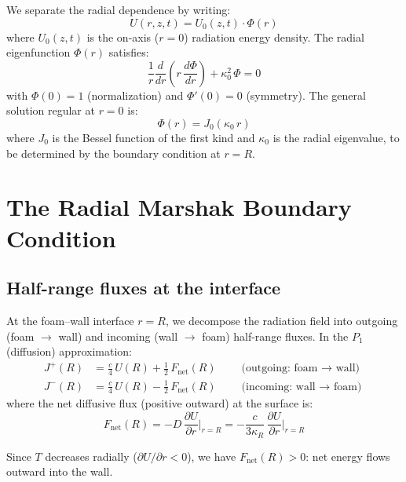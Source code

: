 \documentclass[12pt]{article}
\newcommand{\Rcm}{R}
\newcommand{\pder}[2]{\frac{\partial #1}{\partial #2}}
\begin{document}
We separate the radial dependence by writing:
\begin{equation}
    U(r, z, t) = U_0(z, t) \cdot \Phi(r)
    \label{eq:U_separation}
\end{equation}
where $U_0(z,t)$ is the on-axis ($r=0$) radiation energy density. The radial
eigenfunction $\Phi(r)$ satisfies:
\begin{equation}
    \frac{1}{r}\frac{d}{dr}\left(r\,\frac{d\Phi}{dr}\right) + \kappa_0^2\,\Phi = 0
    \label{eq:bessel_ode}
\end{equation}
with $\Phi(0) = 1$ (normalization) and $\Phi'(0) = 0$ (symmetry). The general
solution regular at $r = 0$ is:
\begin{equation}
    \boxed{\Phi(r) = J_0(\kappa_0\, r)}
    \label{eq:bessel_solution}
\end{equation}
where $J_0$ is the Bessel function of the first kind and $\kappa_0$ is the
radial eigenvalue, to be determined by the boundary condition at $r = \Rcm$.


\section{The Radial Marshak Boundary Condition}

\subsection{Half-range fluxes at the interface}

At the foam--wall interface $r = \Rcm$, we decompose the radiation field
into outgoing (foam $\to$ wall) and incoming (wall $\to$ foam) half-range
fluxes. In the $P_1$ (diffusion) approximation:
\begin{align}
    J^+(R) &= \frac{c}{4}\,U(R) + \frac{1}{2}\,F_{\mathrm{net}}(R)
    \qquad \text{(outgoing: foam $\to$ wall)}
    \label{eq:J_plus} \\[6pt]
    J^-(R) &= \frac{c}{4}\,U(R) - \frac{1}{2}\,F_{\mathrm{net}}(R)
    \qquad \text{(incoming: wall $\to$ foam)}
    \label{eq:J_minus}
\end{align}
where the net diffusive flux (positive outward) at the surface is:
\begin{equation}
    F_{\mathrm{net}}(R) = -D\,\pder{U}{r}\bigg|_{r=R}
    = -\frac{c}{3\kappa_R}\,\pder{U}{r}\bigg|_{r=R}
    \label{eq:F_net}
\end{equation}

Since $T$ decreases radially ($\partial U / \partial r < 0$), we have
$F_{\mathrm{net}}(R) > 0$: net energy flows outward into the wall.
\end{document}
